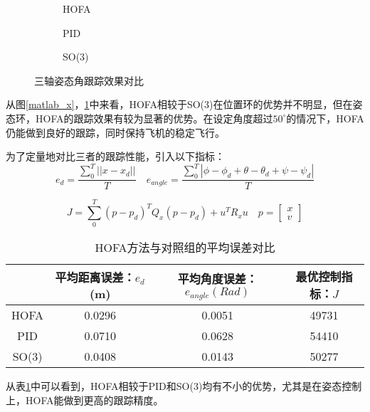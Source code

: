 \begin{figure}[h]
  \centering
  \begin{subfigure}[t]{0.33\textwidth}
    \centering
    \caption{HOFA}
  \end{subfigure}\hfill
  \begin{subfigure}[t]{0.33\textwidth}
    \centering
    \caption{PID}
  \end{subfigure}\hfill
  \begin{subfigure}[t]{0.33\textwidth}
    \centering
    \caption{SO(3)}
  \end{subfigure}
  \caption{三轴姿态角跟踪效果对比}
  \label{matlab_angle}
\end{figure}

从图\ref{matlab_x}，\ref{matlab_angle}中来看，HOFA相较于SO(3)在位置环的优势并不明显，但在姿态环，HOFA的跟踪效果有较为显著的优势。在设定角度超过$50^\circ$的情况下，HOFA仍能做到良好的跟踪，同时保持飞机的稳定飞行。

  
为了定量地对比三者的跟踪性能，引入以下指标：
  $$e_d=\frac{\sum_0^{T}||x-x_d||}{T} \quad e_{angle}=\frac{\sum_0^{T}|\phi-\phi_d+\theta-\theta_d+\psi-\psi_d|}{T}$$

  $$J=\sum_0^{T}(p-p_d)^T Q_x(p-p_d)+u^T R_x u \quad p=\begin{bmatrix}
    x \\ v
  \end{bmatrix}$$
  \begin{table}[h]
    \centering
    \caption{HOFA方法与对照组的平均误差对比}
    \begin{tabular}{cccc}
        \toprule
        & 平均距离误差：$e_d$ (m)& 平均角度误差：$e_{angle}(Rad)$  & 最优控制指标：$J$ \\
        \midrule
        HOFA & 0.0296 & 0.0051 &49731 \\
        PID & 0.0710 & 0.0628 &54410 \\
        SO(3) &0.0408  &0.0143 &50277 \\
        \bottomrule
    \end{tabular}

    \label{matlab对比}
\end{table}

从表\ref{matlab对比}中可以看到，HOFA相较于PID和SO(3)均有不小的优势，尤其是在姿态控制上，HOFA能做到更高的跟踪精度。

